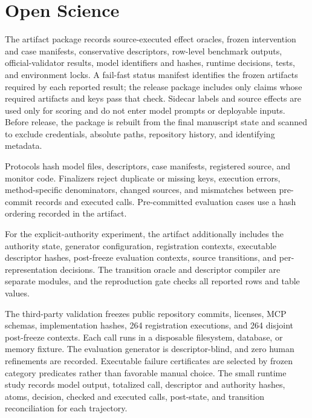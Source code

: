 \section{Open Science}
\label{app:open-science}

The artifact package records source-executed effect oracles, frozen intervention
and case manifests, conservative descriptors, row-level benchmark outputs,
official-validator results, model identifiers and hashes, runtime decisions,
tests, and environment locks.  A fail-fast status manifest identifies the
frozen artifacts required by each reported result; the release package includes
only claims whose required artifacts and keys pass that check.  Sidecar labels
and source effects are used only for scoring and do not enter model prompts or
deployable inputs.  Before release, the package is rebuilt from the final
manuscript state and scanned to exclude credentials, absolute paths, repository
history, and identifying metadata.

Protocols hash model files, descriptors, case manifests, registered source, and
monitor code.  Finalizers reject duplicate or missing keys, execution errors,
method-specific denominators, changed sources, and mismatches between
pre-commit records and executed calls. Pre-committed evaluation cases use a
hash ordering recorded in the artifact.

For the explicit-authority experiment, the artifact additionally includes the
authority state, generator configuration, registration contexts, executable
descriptor hashes, post-freeze evaluation contexts, source transitions, and
per-representation decisions. The transition oracle and descriptor compiler
are separate modules, and the reproduction gate checks all reported rows and
table values.

The third-party validation freezes public repository commits, licenses, MCP
schemas, implementation hashes, 264 registration executions, and 264 disjoint
post-freeze contexts. Each call runs in a disposable filesystem, database, or
memory fixture. The evaluation generator is descriptor-blind, and zero human
refinements are recorded. Executable failure certificates are selected by
frozen category predicates rather than favorable manual choice. The small
runtime study records model output, totalized call, descriptor and authority
hashes, atoms, decision, checked and executed calls, post-state, and transition
reconciliation for each trajectory.
